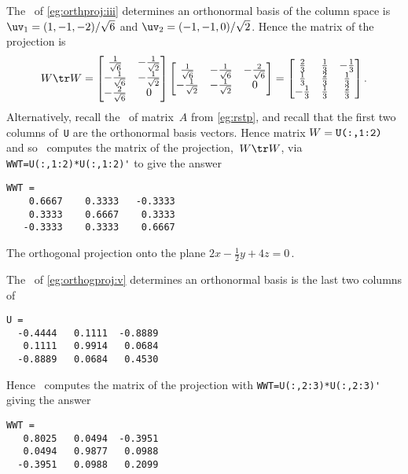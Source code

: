 \begin{example}
\begin{enumerate}
\begin{solution} 
The \svd\ of \cref{eg:orthproj:iii} determines an orthonormal basis of the column space is \(\uv_1=(1,-1,-2)/\sqrt6\) and \(\uv_2=(-1,-1,0)/\sqrt2\).
Hence the matrix of the projection is
\begin{equation*}
W\tr W 
= \begin{bmatrix} \frac1{\sqrt6}&-\frac1{\sqrt2}\\-\frac1{\sqrt6}&-\frac1{\sqrt2}\\-\frac2{\sqrt6}&0 \end{bmatrix}
\begin{bmatrix} \frac1{\sqrt6}&-\frac1{\sqrt6}&-\frac2{\sqrt6}\\ -\frac1{\sqrt2}&-\frac1{\sqrt2}&0\end{bmatrix}
=\begin{bmatrix} \frac23&\frac13&-\frac13\\\frac13&\frac23&\frac13\\-\frac13&\frac13&\frac23 \end{bmatrix}.
\end{equation*}
Alternatively, recall the \svd\ of matrix~\(A\) from \cref{eg:rstp}, and recall that the first two columns of~\verb|U| are the orthonormal basis vectors.  
Hence matrix \(W=\verb|U(:,1:2)|\) and so \script\ computes the matrix of the projection,~\(W\tr W\), via \verb|WWT=U(:,1:2)*U(:,1:2)'| to give the answer
\setbox\ajrqrbox\hbox{}%
\marginajrbox%
\begin{verbatim}
WWT =
    0.6667    0.3333   -0.3333
    0.3333    0.6667    0.3333
   -0.3333    0.3333    0.6667
\end{verbatim}
\end{solution}


\begin{OmitV1}
\item The orthogonal projection onto the plane \(2x-\frac12y+4z=0\)\,.
\begin{solution} 
The \svd\ of  \cref{eg:orthogproj:v}  determines an orthonormal basis is the last two columns of
\begin{verbatim}
U =
  -0.4444   0.1111  -0.8889
   0.1111   0.9914   0.0684
  -0.8889   0.0684   0.4530
\end{verbatim}
Hence \script\ computes the matrix of the projection with \verb|WWT=U(:,2:3)*U(:,2:3)'| giving the answer
\setbox\ajrqrbox\hbox{}%
\marginajrbox%
\begin{verbatim}
WWT =
   0.8025   0.0494  -0.3951
   0.0494   0.9877   0.0988
  -0.3951   0.0988   0.2099
\end{verbatim}
\end{solution}
\end{OmitV1}
\end{enumerate}
\end{example}



